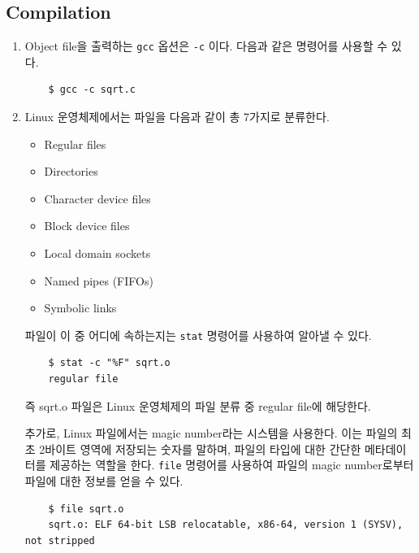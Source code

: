 \subsection{Compilation}

\begin{enumerate}[label= (\alph*)]
    \item {
        Object file을 출력하는 \texttt{gcc} 옵션은 \texttt{-c} 이다.
        다음과 같은 명령어를 사용할 수 있다.

        \begin{verbatim}
    $ gcc -c sqrt.c
        \end{verbatim}
    }

    \item {
        Linux 운영체제에서는 파일을 다음과 같이 총 7가지로 분류한다.
        
        \begin{itemize}
            \item Regular files
            \item Directories
            \item Character device files
            \item Block device files
            \item Local domain sockets
            \item Named pipes (FIFOs)
            \item Symbolic links
        \end{itemize}
        
        파일이 이 중 어디에 속하는지는 \texttt{stat} 명령어를 사용하여 알아낼 수 있다.

        \begin{verbatim}
    $ stat -c "%F" sqrt.o
    regular file
        \end{verbatim}

        즉 sqrt.o 파일은 Linux 운영체제의 파일 분류 중 regular file에 해당한다.

        추가로, Linux 파일에서는 magic number라는 시스템을 사용한다. 이는 파일의 최초 2바이트 영역에
        저장되는 숫자를 말하며, 파일의 타입에 대한 간단한 메타데이터를 제공하는 역할을 한다.
        \texttt{file} 명령어를 사용하여 파일의 magic number로부터 파일에 대한 정보를 얻을 수 있다.

        \begin{verbatim}
    $ file sqrt.o
    sqrt.o: ELF 64-bit LSB relocatable, x86-64, version 1 (SYSV), not stripped
        \end{verbatim}
    }
    
\end{enumerate}

